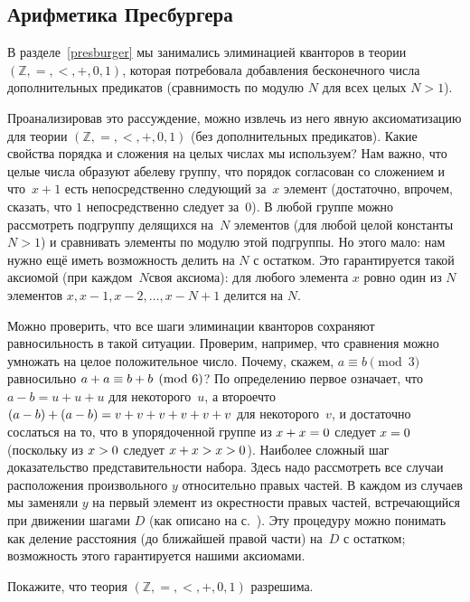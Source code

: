 \subsection*{Арифметика Пресбургера}
%
%
В разделе~\ref{presburger} мы занимались элиминацией кванторов в
теории $(\mathbb{Z},{=},{<},{+},{0},{1})$, которая потребовала
добавления бесконечного числа дополнительных предикатов
(сравнимость по модулю $N$ для всех целых $N>1$).

Проанализировав это рассуждение, можно извлечь из него явную
аксиоматизацию для теории $(\mathbb{Z},{=},{<},{+},{0},{1})$
(без дополнительных предикатов). Какие свойства порядка и
сложения на целых числах мы используем? Нам важно, что целые
числа образуют абелеву группу, что порядок согласован со
сложением и что~${x+1}$ есть непосредственно следующий за~$x$
элемент (достаточно, впрочем, сказать, что $1$ непосредственно
следует за~$0$).
В любой группе можно рассмотреть подгруппу делящихся
на~$N$ элементов (для любой целой константы $N>1$) и сравнивать
элементы по модулю этой подгруппы. Но этого мало: нам нужно ещё
иметь возможность делить на $N$ с остатком. Это гарантируется
такой аксиомой (при каждом~$N$\т своя аксиома): для любого
элемента $x$ ровно один из $N$ элементов $x, {x-1},
{x-2},\dots,{x-N+1}$ делится на $N$.

Можно проверить, что все шаги элиминации кванторов сохраняют
равносильность в такой ситуации. Проверим, например, что
сравнения можно умножать на целое положительное число. Почему,
скажем, ${a\equiv b \pmod 3}$ равносильно
${a+a}\hm\equiv{b+b\pmod 6}$? По определению первое означает,
что $a-b=u+u+u$ для некоторого~$u$, а второе\т что
${(a-b)}\hm+{(a-b)}\hm=v\hm+v\hm+v\hm+v\hm+v\hm+v$ для
некоторого~$v$, и достаточно сослаться на то, что в
упорядоченной группе из ${x+x}\hm=0$ следует $x\hm=0$ (поскольку
из $x\hm>0$ следует $x\hm+x\hm>x\hm>0$). Наиболее сложный шаг\т
доказательство представительности набора. Здесь надо рассмотреть
все случаи расположения произвольного $y$ относительно правых
частей. В каждом из случаев мы заменяли $y$ на первый элемент из
окрестности правых частей, встречающийся при движении шагами $D$
(как описано на с.~\pageref{presburger-set}). Эту процедуру
можно понимать как деление расстояния (до ближайшей правой
части) на~$D$ с остатком; возможность этого гарантируется нашими
аксиомами.

\begin{problem}
Покажите, что теория
$(\mathbb{Z},{=},{<},{+},{0},{1})$ разрешима.
\end{problem}

